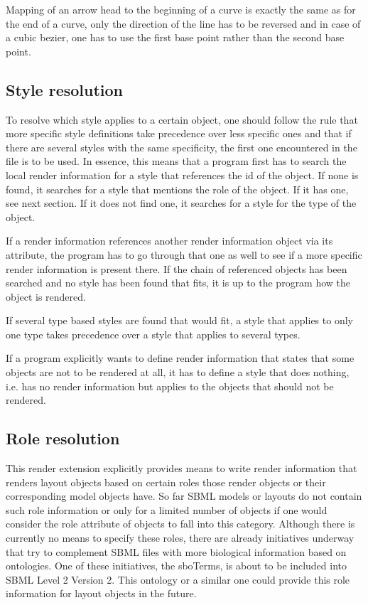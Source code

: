 Mapping of an arrow head to the beginning of a curve is exactly the same as for the end of a curve, only the
direction of the line has to be reversed and in case of a cubic bezier, one has to use the first base point rather than the second base point. 

\subsection{Style resolution}
\label{style-res}

To resolve which style applies to a certain object, one 
should follow the rule that more specific style definitions take precedence 
over less specific ones and that if there are several styles with the same 
specificity, the first one encountered in the file is to be used. In essence,
this means that a program first has to search the local render information for 
a style that references the id of the object. If none is found, it searches for 
a style that mentions the role of the object. If it has one, see next section. 
If it does not find one, it searches for a style for the type of the object. 

If a render information references another render information object via its 
 attribute, the program has to go through 
that one as well to see if a more specific render information is present there. 
If the chain of referenced \RenderInformation objects has been searched and no 
style has been found that fits, it is up to the program how the object is 
rendered. 

If several type based styles are found 
that would fit, a style that applies to only one type takes precedence over a 
style that applies to several types.

If a program explicitly wants to define render information that 
states that some objects are not to be rendered at all, it has to define a 
style that does nothing, i.e. has no render information but applies to the 
objects that should not be rendered. 


\subsection{Role resolution}
\label{role-res}

This render extension explicitly provides means to write render information
that renders layout objects based on certain roles those render objects or their
corresponding model objects have. So far SBML models or layouts do not contain
such role information or only for a limited number of objects if one would
consider the role attribute of  objects to fall into this category.
Although there is currently no means to specify these roles, there are already
initiatives underway that try to complement SBML files with more biological
information based on ontologies. One of these initiatives, the sboTerms, is
about to be included into SBML Level 2 Version 2. This ontology or a similar
one could provide this role information for layout objects in the future.   

